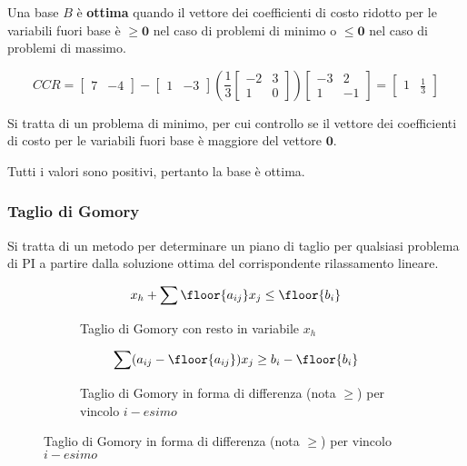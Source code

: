 \documentclass[\main/main.tex]{subfiles}
\begin{document}
\begin{definition}
  Una base $B$ è \textbf{ottima} quando il vettore dei coefficienti di costo ridotto per le variabili fuori base è $\geq \bm{0}$ nel caso di problemi di minimo o $\leq \bm{0}$ nel caso di problemi di massimo.
\end{definition}

\[
  CCR = \begin{bmatrix}
    7 & -4
  \end{bmatrix}
  -
  \begin{bmatrix}
    1 & -3
  \end{bmatrix}
  \left(
  \frac{1}{3}
  \begin{bmatrix}
    -2 & 3 \\
    1  & 0
  \end{bmatrix}
  \right)
  \begin{bmatrix}
    -3 & 2  \\
    1  & -1
  \end{bmatrix}
  = \begin{bmatrix}
    1 & \frac{1}{3}
  \end{bmatrix}
\]

Si tratta di un problema di minimo, per cui controllo se il vettore dei coefficienti di costo per le variabili fuori base è maggiore del vettore $\bm{0}$.

Tutti i valori sono positivi, pertanto la base è ottima.

\subsubsection*{Taglio di Gomory}

\begin{definition}
  Si tratta di un metodo per determinare un piano di taglio per qualsiasi problema di PI a partire dalla soluzione ottima del corrispondente rilassamento lineare.

  \begin{figure}
    \begin{subfigure}{0.49\textwidth}
      \[
        x_h + \sum \floor{a_{ij}}x_j \leq \floor{b_i}
      \]
      \caption{Taglio di Gomory con resto in variabile $x_h$}
      \label{gomory_cut_formula_general}
    \end{subfigure}
    \begin{subfigure}{0.49\textwidth}
      \[
        \sum (a_{ij} - \floor{a_{ij}})x_j \geq b_i-\floor{b_i}
      \]
      \caption{Taglio di Gomory in forma di differenza (nota $\geq  $) per vincolo $i-esimo$}
      \label{gomory_cut_formula}
    \end{subfigure}
  \end{figure}
\end{definition}
\end{document}
